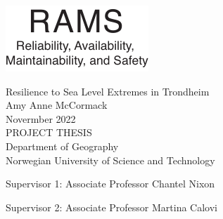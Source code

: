 
\newcommand*\FirstPage{
\thispagestyle{empty}
}

\thispagestyle{empty}
\includegraphics[scale=1.1]{fig/rams}
\mbox{}\\[6pc]
\begin{center}
\Huge{Resilience to Sea Level Extremes in Trondheim}\\[2pc]

\Large{Amy Anne McCormack}\\[1pc]
\large{Novermber 2022}\\[2pc]

PROJECT THESIS\\
Department of Geography\\
Norwegian University of Science and Technology
\end{center}
\vfill

\noindent Supervisor 1: Associate Professor Chantel Nixon

\noindent Supervisor 2: Associate Professor Martina Calovi

